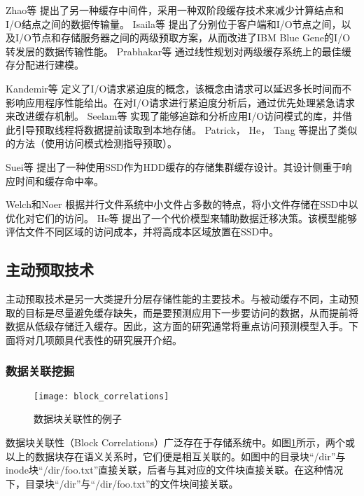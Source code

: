 Zhao等\cite{HyCache+}
提出了另一种缓存中间件，采用一种双阶段缓存技术来减少计算结点和I/O结点之间的数据传输量。
Isaila等\cite{Multi_Leve_Data_Staging_for_Blue_Gene}
提出了分别位于客户端和I/O节点之间，以及I/O节点和存储服务器之间的两级预取方案，从而改进了IBM Blue Gene的I/O转发层的数据传输性能。
Prabhakar等\cite{Adaptive_Multi_level_Cache_Allocation_in_Distribute_Storage_Architectures}
通过线性规划对两级缓存系统上的最佳缓存分配进行建模。

Kandemir等\cite{On_Urgency_of_I/O_Operations}
定义了I/O请求紧迫度的概念，该概念由请求可以延迟多长时间而不影响应用程序性能给出。在对I/O请求进行紧迫度分析后，通过优先处理紧急请求来改进缓存机制。
Seelam等\cite{Masking_IO_latency_using_application_level_IO_caching_and_prefetching_on_Blue_Gene_systems}
实现了能够追踪和分析应用I/O访问模式的库，并借此引导预取线程将数据提前读取到本地存储。
Patrick\cite{Cashing_in_on_Hints_for_Better_Prefetching_and_Caching_in_PVFS_and_MPI_IO}，
He\cite{KNOWAC}，
Tang\cite{Improving_read_performance_with_online_access_pattern_analysis_and_prefetching}
等提出了类似的方法（使用访问模式检测指导预取）。

Suei等\cite{Endurance_Aware_Flash_Cache_Management_for_Storage_Servers}
提出了一种使用SSD作为HDD缓存的存储集群缓存设计。其设计侧重于响应时间和缓存命中率。 

Welch和Noer\cite{Optimizing_a_hybrid_SSD_HDD_HPC_storage_system_based_on_file_size_distributions}
根据并行文件系统中小文件占多数的特点，将小文件存储在SSD中以优化对它们的访问。
He等\cite{Proceedings_of_the_22nd_international_symposium_on_High_performance_parallel_and_distributed_computing}
提出了一个代价模型来辅助数据迁移决策。该模型能够评估文件不同区域的访问成本，并将高成本区域放置在SSD中。

\subsection{主动预取技术}
主动预取技术是另一大类提升分层存储性能的主要技术。与被动缓存不同，主动预取的目标是尽量避免缓存缺失，而是要预测应用下一步要访问的数据，从而提前将数据从低级存储迁入缓存。因此，这方面的研究通常将重点访问预测模型入手。下面将对几项颇具代表性的研究展开介绍。



\subsubsection*{数据关联挖掘}
\begin{figure}[htp]
\centering
\texttt{[image: block\_correlations]}
\caption{数据块关联性的例子}
\label{fig:block_correlations}
\end{figure}
数据块关联性（Block Correlations）广泛存在于存储系统中。如图\ref{fig:block_correlations}所示，两个或以上的数据块存在语义关系时，它们便是相互关联的。如图中的目录块“/dir”与inode块“/dir/foo.txt”直接关联，后者与其对应的文件块直接关联。在这种情况下，目录块“/dir”与“/dir/foo.txt”的文件块间接关联。

